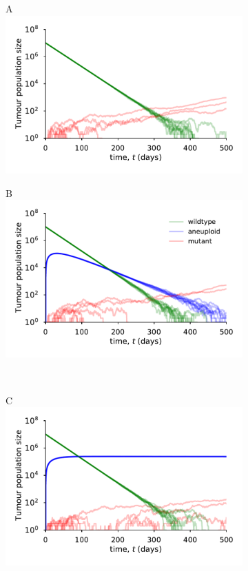 \documentclass[12pt]{extarticle}
\begin{document}
\begin{figure}
\begin{subfigure}{0.5\textwidth}
A\\
\includegraphics[width=1\textwidth]{Figures/TauLeapMeanTimeDiagramNoAneuploidy.pdf}
\end{subfigure}
\begin{subfigure}{0.5\textwidth}
B\\
\includegraphics[width=1\textwidth]{Figures/TauLeapMeanTimeDiagramSmallda.pdf}
\end{subfigure}
\\
\begin{subfigure}{0.5\textwidth}
C\\
\includegraphics[width=1\textwidth]{Figures/TauLeapMeanTimeDiagramdazero.pdf}

\end{subfigure}
\end{figure}
\end{document}
